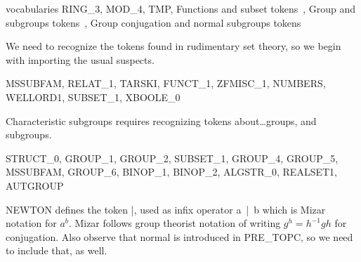 \nwenddocs{}\endmoddef\nwstartdeflinemarkup{}\nwenddeflinemarkup
vocabularies RING_3, MOD_4, TMP,
  \LA{}Functions and subset tokens~{\nwtagstyle{}}\RA{},
  \LA{}Group and subgroups tokens~{\nwtagstyle{}}\RA{},
  \LA{}Group conjugation and normal subgroups tokens~{\nwtagstyle{}}\RA{}

\nwendcode{}\nwdocspar

\M
We need to recognize the tokens found in rudimentary set theory, so we
begin with importing the usual suspects.

\nwenddocs{}\endmoddef\nwstartdeflinemarkup{}\nwenddeflinemarkup
MSSUBFAM, RELAT_1, TARSKI, FUNCT_1, ZFMISC_1, NUMBERS, WELLORD1,
SUBSET_1, XBOOLE_0

\nwendcode{}\nwdocspar

\M
Characteristic subgroups requires recognizing tokens about\dots groups,
and subgroups.

\nwenddocs{}\endmoddef\nwstartdeflinemarkup{}\nwenddeflinemarkup
STRUCT_0, GROUP_1, GROUP_2, SUBSET_1, GROUP_4, GROUP_5,
MSSUBFAM, GROUP_6, BINOP_1, BINOP_2, ALGSTR_0, REALSET1,
AUTGROUP

\nwendcode{}\nwdocspar

\M
{\Tt{}NEWTON\nwendquote} defines the token {\Tt{}|{}\nwendquote}, used as infix operator {\Tt{}a\ |{}\ b\nwendquote}
which is Mizar notation for $a^{b}$. Mizar follows group theorist
notation of writing $g^{h} = h^{-1}gh$ for conjugation. Also observe
that {\Tt{}normal\nwendquote} is introduced in {\Tt{}PRE{\_}TOPC\nwendquote}, so we need to include
that, as well.

